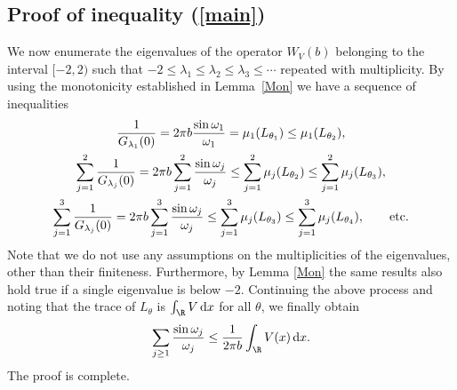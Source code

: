\subsection[Proof of inequality (1.2)]{Proof of inequality (\ref{main})}

We now enumerate the eigenvalues of the operator $W_V(b)$ belonging to the interval $[-2,2)$ such that
$-2\le \lambda_1\le\lambda_2\le\lambda_3\le \cdots$ repeated with multiplicity.
By using the monotonicity established in Lemma~\ref{Mon} we have a sequence of inequalities
\begin{gather*}
\frac{1}{G_{\lambda_1}(0)} =2\pi b \frac{\sin\omega_1}{\omega_1} = \mu_1(L_{\theta_1}) \le \mu_1(L_{\theta_2}),
\\
\sum_{j=1}^2 \frac{1}{G_{\lambda_j}(0)} = 2\pi b \sum_{j=1}^2 \frac{\sin\omega_j}{\omega_j}
\le \sum_{j=1}^2 \mu_j(L_{\theta_2})
\le \sum_{j=1}^2 \mu_j(L_{\theta_3}),
\\
\sum_{j=1}^3 \frac{1}{G_{\lambda_j}(0)} = 2\pi b \sum_{j=1}^3 \frac{\sin\omega_j}{\omega_j}
\le \sum_{j=1}^3 \mu_j(L_{\theta_3})
\le \sum_{j=1}^3 \mu_j(L_{\theta_4}), \qquad {\rm etc}.
\end{gather*}
Note that we do not use any assumptions on the multiplicities of the eigenvalues, other than their finiteness. Furthermore, by Lemma \ref{Mon} the same results also hold true if a single eigenvalue is below $-2$.
Continuing the above process and noting that the trace of $L_{\theta}$ is $\int_\R V \, {\rm d} x$ for all $\theta$, we finally obtain
\begin{gather*}
\sum_{j\ge1}\frac{\sin\omega_j}{\omega_j}\le \frac{1}{2\pi b}\int_{\R}V(x)\, {\rm d} x.
\end{gather*}
The proof is complete.
